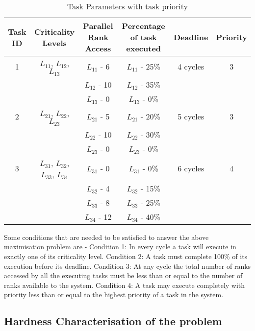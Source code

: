 \begin{table}[t]
 \begin{tabular}{|c|c|c|c|c|c|}\hline
 Task ID & Criticality Levels & Parallel Rank Access  & Percentage of task executed & Deadline & Priority\\ \hline
 1 & {$L_{11}$, $L_{12}$, $L_{13}$} & $L_{11}$ - 6 & $L_{11}$ - 25\% & 4 cycles & 3 \\
   &  & $L_{12}$ - 10 & $L_{12}$ - 35\% & &  \\
   &  & $L_{13}$ - 0 & $L_{13}$ - 0\% & & \\ \hline
 2 & {$L_{21}$, $L_{22}$, $L_{23}$} & $L_{21}$ - 5 & $L_{21}$ - 20\% & 5 cycles & 3\\
   &  & $L_{22}$ - 10 & $L_{22}$ - 30\% & & \\
   &  & $L_{23}$ - 0 & $L_{23}$ - 0\% & & \\ \hline
 3 & {$L_{31}$, $L_{32}$, $L_{33}$, $L_{34}$} & $L_{31}$ - 0 & $L_{31}$ - 0\% & 6 cycles & 4 \\
   &  & $L_{32}$ - 4 & $L_{32}$ - 15\% & & \\
   &  & $L_{33}$ - 8 & $L_{33}$ - 25\% & & \\
   &  & $L_{34}$ - 12 & $L_{34}$ - 40\% & & \\ \hline 
 \end{tabular}
\caption{Task Parameters with task priority}
\label{tab3}
\end{table}
Some conditions that are needed to be satisfied to answer the above maximisation problem are - 
\newline
\newline
Condition 1: In every cycle a task will execute in exactly one of its criticality level.
\newline
\newline
Condition 2: A task must complete 100\% of its execution before its deadline.
\newline
\newline
Condition 3: At any cycle the total number of ranks accessed by all the executing tasks must be less than or equal to the 
number of ranks available to the system.
\newline
\newline
Condition 4: A task may execute completely with priority less than or equal to the highest priority of a task in the system.
\newline
\subsection{Hardness Characterisation of the problem}\label{hcp}

